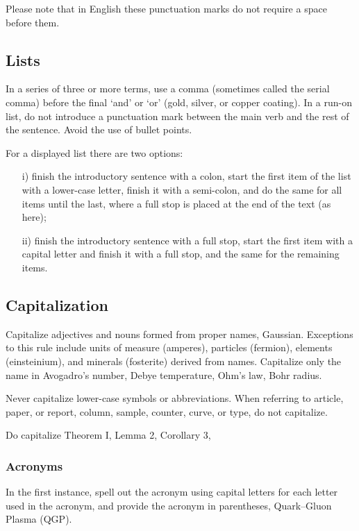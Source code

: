 \documentclass{cernrep}
\begin{document}
Please note that in English these punctuation marks do not require a
space before them.

\subsection{Lists}

In a series of three or more terms, use a comma (sometimes called the
serial comma) before the final `and' or `or' (\eg gold, silver, or
copper coating). In a run-on list, do not introduce a punctuation mark
between the main verb and the rest of the sentence.  Avoid the use of
bullet points.

For a displayed list there are two options:

\begin{itemize}
\item[i)]  finish the introductory sentence with a colon, start the
           first item of the list with a lower-case letter, finish it
           with a semi-colon, and do the same for all items until the
           last, where a full stop is placed at the end of the text
           (as here);
\item[ii)] finish the introductory sentence with a full stop, start
           the first item with a capital letter and finish it with a
           full stop, and the same for the remaining items.
\end{itemize}

\subsection{Capitalization}

Capitalize adjectives and nouns formed from proper names,
\eg Gaussian.  Exceptions to this rule include units of measure
(amperes), particles (fermion), elements (einsteinium), and minerals
(fosterite) derived from names.  Capitalize only the name in
Avogadro's number, Debye temperature, Ohm's law, Bohr radius.

Never capitalize lower-case symbols or abbreviations. When referring
to article, paper, or report, column, sample, counter, curve, or type,
do not capitalize.

Do capitalize Theorem I, Lemma 2, Corollary 3, \etc

\subsubsection{Acronyms}

In the first instance, spell out the acronym using capital letters for
each letter used in the acronym, and provide the acronym in
parentheses, \eg Quark--Gluon Plasma (QGP).
\end{document}
